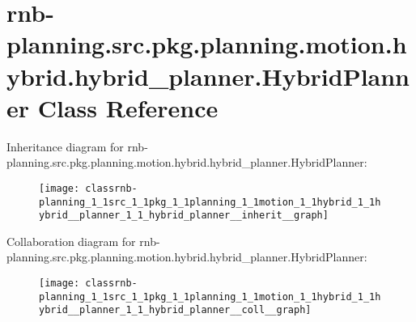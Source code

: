 \hypertarget{classrnb-planning_1_1src_1_1pkg_1_1planning_1_1motion_1_1hybrid_1_1hybrid__planner_1_1_hybrid_planner}{}\section{rnb-\/planning.src.\+pkg.\+planning.\+motion.\+hybrid.\+hybrid\+\_\+planner.\+Hybrid\+Planner Class Reference}
\label{classrnb-planning_1_1src_1_1pkg_1_1planning_1_1motion_1_1hybrid_1_1hybrid__planner_1_1_hybrid_planner}


Inheritance diagram for rnb-\/planning.src.\+pkg.\+planning.\+motion.\+hybrid.\+hybrid\+\_\+planner.\+Hybrid\+Planner\+:\nopagebreak
\begin{figure}[H]
\begin{center}
\leavevmode
\texttt{[image: classrnb-planning\_1\_1src\_1\_1pkg\_1\_1planning\_1\_1motion\_1\_1hybrid\_1\_1hybrid\_\_planner\_1\_1\_hybrid\_planner\_\_inherit\_\_graph]}
\end{center}
\end{figure}


Collaboration diagram for rnb-\/planning.src.\+pkg.\+planning.\+motion.\+hybrid.\+hybrid\+\_\+planner.\+Hybrid\+Planner\+:\nopagebreak
\begin{figure}[H]
\begin{center}
\leavevmode
\texttt{[image: classrnb-planning\_1\_1src\_1\_1pkg\_1\_1planning\_1\_1motion\_1\_1hybrid\_1\_1hybrid\_\_planner\_1\_1\_hybrid\_planner\_\_coll\_\_graph]}
\end{center}
\end{figure}
